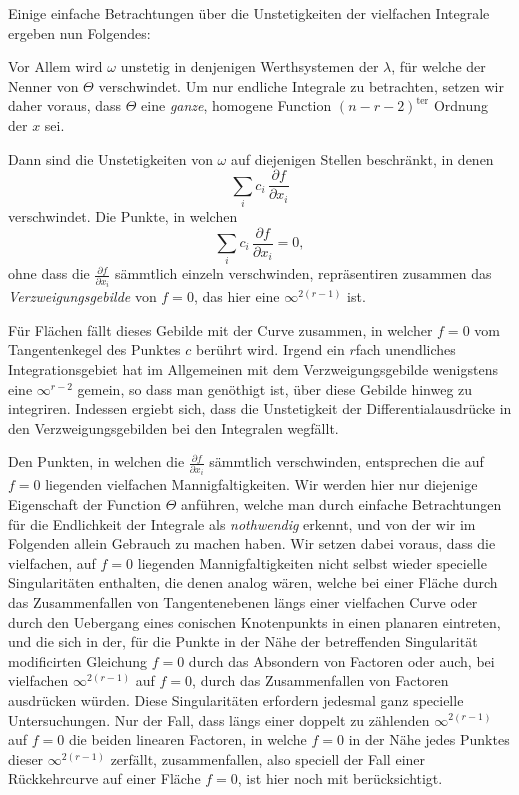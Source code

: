 \documentclass{article}
\begin{document}
Einige einfache Betrachtungen über die Unstetigkeiten der vielfachen Integrale ergeben nun Folgendes:

Vor Allem wird $\omega$ unstetig in denjenigen Werthsystemen der $\lambda$, für welche der Nenner von $\Theta$ verschwindet. Um nur endliche Integrale zu betrachten, setzen wir daher voraus, dass $\Theta$ eine \emph{ganze}, homogene Function $(n - r - 2)^{\text{ter}}$ Ordnung der $x$ sei.

Dann sind die Unstetigkeiten von $\omega$ auf diejenigen Stellen beschränkt, in denen
\[
\sum_i c_i\, \frac{\partial f}{\partial x_i}
\]
verschwindet. Die Punkte, in welchen
\[
\sum_i c_i\, \frac{\partial f}{\partial x_i} = 0,
\]
ohne dass die $\frac{\partial f}{\partial x_i}$ sämmtlich einzeln verschwinden, repräsentiren zusammen das \emph{Verzweigungsgebilde} von $f = 0$, das hier eine $\infty^{2(r-1)}$ ist.

Für Flächen fällt dieses Gebilde mit der Curve zusammen, in welcher $f = 0$ vom Tangentenkegel des Punktes $c$ berührt wird. Irgend ein $r$fach unendliches Integrationsgebiet hat im Allgemeinen mit dem Verzweigungsgebilde wenigstens eine $\infty^{r-2}$ gemein, so dass man genöthigt ist, über diese Gebilde hinweg zu integriren. Indessen ergiebt sich, dass die Unstetigkeit der Differentialausdrücke in den Verzweigungsgebilden bei den Integralen wegfällt.

Den Punkten, in welchen die $\frac{\partial f}{\partial x_i}$ sämmtlich verschwinden, entsprechen die auf $f = 0$ liegenden vielfachen Mannigfaltigkeiten. Wir werden hier nur diejenige Eigenschaft der Function $\Theta$ anführen, welche man durch einfache Betrachtungen für die Endlichkeit der Integrale als \emph{nothwendig} erkennt, und von der wir im Folgenden allein Gebrauch zu machen haben. Wir setzen dabei voraus, dass die vielfachen, auf $f = 0$ liegenden Mannigfaltigkeiten nicht selbst wieder specielle Singularitäten enthalten, die denen analog wären, welche bei einer Fläche durch das Zusammenfallen von Tangentenebenen längs einer vielfachen Curve oder durch den Uebergang eines conischen Knotenpunkts in einen planaren eintreten, und die sich in der, für die Punkte in der Nähe der betreffenden Singularität modificirten Gleichung $f = 0$ durch das Absondern von Factoren oder auch, bei vielfachen $\infty^{2(r-1)}$ auf $f = 0$, durch das Zusammenfallen von Factoren ausdrücken würden. Diese Singularitäten erfordern jedesmal ganz specielle Untersuchungen. Nur der Fall, dass längs einer doppelt zu zählenden $\infty^{2(r-1)}$ auf $f = 0$ die beiden linearen Factoren, in welche $f = 0$ in der Nähe jedes Punktes dieser $\infty^{2(r-1)}$ zerfällt, zusammenfallen, also speciell der Fall einer Rückkehrcurve auf einer Fläche $f = 0$, ist hier noch mit berücksichtigt.
\end{document}
